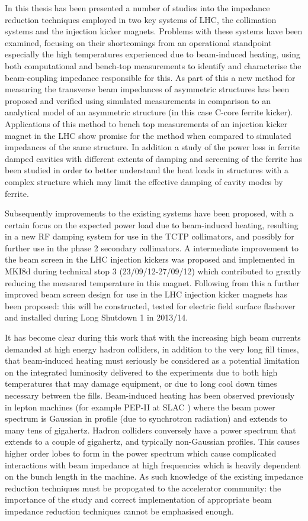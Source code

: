 In this thesis has been presented a number of studies into the impedance reduction techniques employed in two key systems of LHC, the collimation systems and the injection kicker magnets. Problems with these systems have been examined, focusing on their shortcomings from an operational standpoint especially the high temperatures experienced due to beam-induced heating, using both computational and bench-top measurements to identify and characterise the beam-coupling impedance responsible for this. As part of this a new method for measuring the transverse beam impedances of asymmetric structures has been proposed and verified using simulated measurements in comparison to an analytical model of an asymmetric structure (in this case C-core ferrite kicker). Applications of this method to bench top measurements of an injection kicker magnet in the LHC show promise for the method when compared to simulated impedances of the same structure. In addition a study of the power loss in ferrite damped cavities with different extents of damping and screening of the ferrite has been studied in order to better understand the heat loads in structures with a complex structure which may limit the effective damping of cavity modes by ferrite.

Subsequently improvements to the existing systems have been proposed, with a certain focus on the expected power load due to beam-induced heating, resulting in a new RF damping system for use in the TCTP collimators, and possibly for further use in the phase 2 secondary collimators. A intermediate improvement to the beam screen in the LHC injection kickers was proposed and implemented in MKI8d during technical stop 3 (23/09/12-27/09/12) which contributed to greatly reducing the measured temperature in this magnet. Following from this a further improved beam screen design for use in the LHC injection kicker magnets has been proposed: this will be constructed, tested for electric field surface flashover and installed during Long Shutdown 1 in 2013/14.

It has become clear during this work that with the increasing high beam currents demanded at high energy hadron colliders, in addition to the very long fill times, that beam-induced heating must seriously be considered as a potential limitation on the integrated luminosity delivered to the experiments due to both high temperatures that may damage equipment, or due to long cool down times necessary between the fills. Beam-induced heating has been observed previously in lepton machines (for example PEP-II at SLAC \cite{Pivi:PEP}) where the beam power spectrum is Gaussian in profile (due to synchrotron radiation) and extends to many tens of gigahertz. Hadron colliders conversely have a power spectrum that extends to a couple of gigahertz, and typically non-Gaussian profiles. This causes higher order lobes to form in the power spectrum which cause complicated interactions with beam impedance at high frequencies which is heavily dependent on the bunch length in the machine. As such knowledge of the existing impedance reduction techniques must be propogated to the accelerator community: the importance of the study and correct implementation of appropriate beam impedance reduction techniques cannot be emphasised enough.